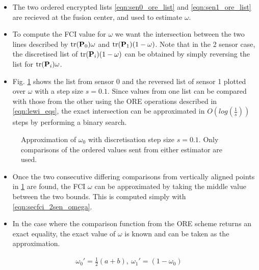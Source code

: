 \documentclass[letterpaper, 10 pt, conference]{ieeeconf}  %
\begin{document}
\begin{itemize}
   \item The two ordered encrypted lists \eqref{eqn:sen0_ore_list} and \eqref{eqn:sen1_ore_list} are recieved at the fusion center, and used to estimate $\omega$.
   \item To compute the FCI value for $\omega$ we want the intersection between the two lines described by $\operatorname{tr}({{\mathbf{P}}}_0)\omega$ and $\operatorname{tr}({{\mathbf{P}}}_1)(1-\omega)$. Note that in the 2 sensor case, the discretised list of $\operatorname{tr}({{\mathbf{P}}}_i)(1-\omega)$ can be obtained by simply reversing the list for $\operatorname{tr}({{\mathbf{P}}}_i)\omega$.
   \item Fig. \ref{fig:2_sensor_sol} shows the list from sensor 0 and the reversed list of sensor 1 plotted over $\omega$ with a step size $s=0.1$. Since values from one list can be compared with those from the other using the ORE operations described in \eqref{eqn:lewi_eqs}, the exact intersection can be approximated in $O(log(\frac{1}{s}))$ steps by performing a binary search.
\end{itemize}
\begin{figure}[htb]
   \begin{center}
      
   \end{center}
   \caption{Approximation of $\omega_0$ with discretisation step size $s=0.1$. Only comparisons of the ordered values sent from either estimator are used.}
   \label{fig:2_sensor_sol}
\end{figure}
\begin{itemize}
   \item Once the two consecutive differing comparisons from vertically aligned points in \ref{fig:2_sensor_sol} are found, the FCI $\omega$ can be approximated by taking the middle value between the two bounds. This is computed simply with \eqref{eqn:secfci_2sen_omega}.
   \item In the case where the comparison function from the ORE scheme returns an exact equality, the exact value of $\omega$ is known and can be taken as the approximation.
\end{itemize}
\begin{gather}
   \omega_0'=\frac{1}{2}(a + b),\ \omega_1' = (1-\omega_0) \label{eqn:secfci_2sen_omega}
\end{gather}
\end{document}
